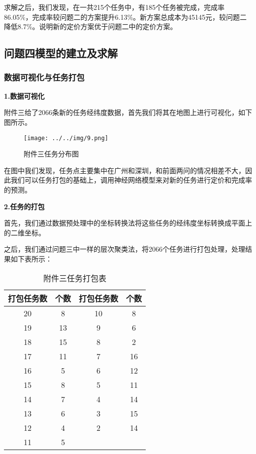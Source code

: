\documentclass[withoutpreface,bwprint]{cumcmthesis} %
\begin{document}
  
求解之后，我们发现，在一共215个任务中，有185个任务被完成，完成率86.05\%，完成率较问题二的方案提升6.13\%。新方案总成本为45145元，较问题二降低8.7\%。说明新的定价方案优于问题二中的定价方案。


\subsection{问题四模型的建立及求解}
\subsubsection{数据可视化与任务打包}
\textbf{1.数据可视化}

附件三给了2066条新的任务经纬度数据，首先我们将其在地图上进行可视化，如下图所示。

\begin{figure}[H]
	\small
	\centering
	\texttt{[image: ../../img/9.png]}
	\caption{附件三任务分布图} 
\end{figure}

在图中我们发现，任务点主要集中在广州和深圳，和前面两问的情况相差不大，因此我们可以任务打包的基础上，调用神经网络模型来对新的任务进行定价和完成率的预测。

\textbf{2.任务的打包}

首先，我们通过数据预处理中的坐标转换法将这些任务的经纬度坐标转换成平面上的二维坐标。

之后，我们通过问题三中一样的层次聚类法，将2066个任务进行打包处理，处理结果如下表所示：

\begin{table}[H]
	\centering
	\caption{附件三任务打包表}
	\begin{tabular}{|c|c|c|c|}
		\hline
		打包任务数 & 个数 & 打包任务数 & 个数 \\ \hline
		20    & 8  & 10    & 8  \\ \hline
		19    & 13 & 9     & 6  \\ \hline
		18    & 15 & 8     & 2  \\ \hline
		17    & 11 & 7     & 16 \\ \hline
		16    & 5  & 6     & 12 \\ \hline
		15    & 8  & 5     & 11 \\ \hline
		14    & 7  & 4     & 14 \\ \hline
		13    & 6  & 3     & 15 \\ \hline
		12    & 4  & 2     & 14 \\ \hline
		11    & 5  &       &    \\ \hline
	\end{tabular}
\end{table}
\end{document}
